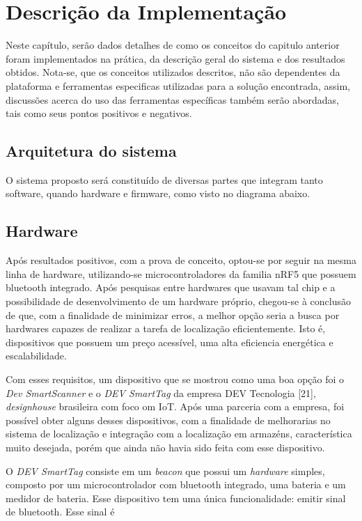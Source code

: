 \chapter{Descrição da Implementação}
Neste capítulo, serão dados detalhes de como os conceitos do capitulo anterior foram implementados na prática, da descrição geral do sistema e dos resultados obtidos.
Nota-se, que os conceitos utilizados descritos, não são dependentes da plataforma e ferramentas especificas utilizadas para a solução encontrada, assim, discussões acerca do uso das ferramentas específicas também serão abordadas, tais como seus pontos positivos e negativos.


\section{Arquitetura do sistema}
O sistema proposto será constituído de diversas partes que integram tanto software, quando hardware e firmware, como visto no diagrama abaixo.

\section{Hardware}
Após resultados positivos, com a prova de conceito, optou-se por seguir na mesma linha de hardware, utilizando-se microcontroladores da familia nRF5 que possuem bluetooth integrado. Após pesquisas entre hardwares que usavam tal chip e a possibilidade de desenvolvimento de um hardware próprio, chegou-se à conclusão de que, com a finalidade de minimizar erros, a melhor opção seria a busca por hardwares capazes de realizar a tarefa de localização eficientemente. Isto é, dispositivos que possuem um preço acessível, uma alta eficiencia energética e escalabilidade.

Com esses requisitos, um dispositivo que se mostrou como uma boa opção foi o \textit{Dev SmartScanner} e o \textit{DEV SmartTag} da empresa DEV Tecnologia [21], \textit{designhouse} brasileira com foco om IoT. Após uma parceria com a empresa, foi possível obter alguns desses dispositivos, com a finalidade de melhorarias no sistema de localização e integração com a localização em armazéns, característica muito desejada, porém que ainda não havia sido feita com esse dispositivo.

O \textit{DEV SmartTag} consiste em um \textit{beacon} que possui um \textit{hardware} simples, composto por um microcontrolador com bluetooth integrado, uma bateria e um medidor de bateria. Esse dispositivo tem uma única funcionalidade: emitir sinal de bluetooth.
Esse sinal é 

